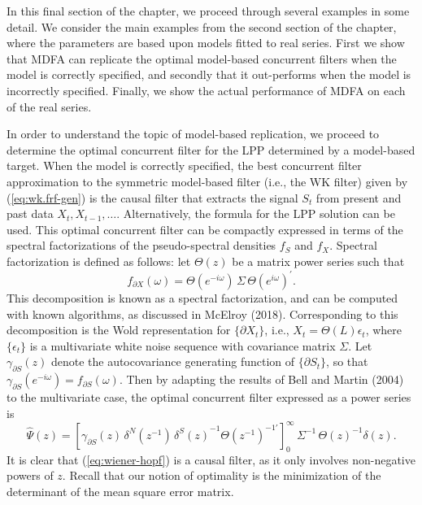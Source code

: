 \documentclass[a4paper]{book}
\begin{document}
In this final section of the chapter, we proceed through several examples
 in some detail.  We consider the main examples from the second section of the
  chapter, where the parameters are based upon models fitted to real series.
  First we show that MDFA can replicate the optimal model-based concurrent filters
  when the model is correctly specified, and secondly that it out-performs
  when the model is incorrectly specified.
  Finally, we show the actual performance of MDFA on each of the real series.
   
  
In order to understand the topic of model-based replication, we proceed
to determine the optimal concurrent filter for the LPP determined by a model-based
target.  When the model is correctly specified, the best concurrent filter 
 approximation to the symmetric model-based filter (i.e., the WK filter) given by
 (\ref{eq:wk.frf-gen}) is the causal filter that extracts the signal $S_t$ from
  present and past data $X_t, X_{t-1}, \ldots$.  Alternatively, the formula
   for the LPP solution can be used.  This optimal concurrent filter can be
   compactly expressed in terms of the spectral factorizations of the 
      pseudo-spectral densities $f_S$ and $f_X$.
    Spectral factorization is defined as follows: 
    let $\Theta (z)$ be a matrix power series such that
 \begin{equation}
 \label{eq:spectral-factor}
  f_{\partial X} (\omega) = \Theta (e^{-i \omega}) \, \Sigma \, 
    {\Theta (e^{i \omega})}^{\prime}.
 \end{equation}
 This decomposition is known as a spectral factorization, and can be computed
 with known algorithms, as discussed in McElroy (2018).
  Corresponding to this decomposition is the Wold representation for $\{ \partial X_t \}$,
   i.e., $X_t = \Theta (L) \epsilon_t$,  where $\{ \epsilon_t \}$ is a multivariate 
   white noise sequence with covariance matrix $\Sigma$. 
  Let $\gamma_{\partial S} (z)$ denote the autocovariance generating function
  of $\{ \partial S_t \}$, so that 
   $\gamma_{\partial S} (e^{-i \omega}) = f_{\partial S} (\omega)$.  
    Then by adapting the results of Bell and Martin (2004) to the multivariate case, 
    the optimal concurrent filter  expressed as a power series is 
\begin{equation}
\label{eq:wiener-hopf}
  \widehat{\Psi} (z) =  
    { \left[  \gamma_{\partial S} (z) \,  \delta^N (z^{-1}) \, {\delta^S (z)}^{-1}
     { \Theta (z^{-1})}^{-1 \prime} \right] }_0^{\infty} \, \Sigma^{-1} \,
     { \Theta (z) }^{-1} \delta (z). 
\end{equation}
  It is clear that (\ref{eq:wiener-hopf}) is a causal filter,
  as it only involves non-negative powers of $z$.
 Recall that our notion of optimality is the minimization of the determinant
 of the mean square error matrix.
\end{document}
